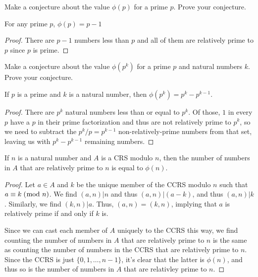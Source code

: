 \documentclass[../main.tex]{subfiles}
\begin{document}
\begin{ex} \label{6.18}
  Make a conjecture about the value $\phi(p)$ for a prime $p$. Prove your conjecture.
\end{ex}

\begin{PC} \label{PC 6.18}
  For any prime $p$, $\phi(p) = p-1$
\end{PC}

\begin{proof}
  There are $p-1$ numbers less than $p$ and all of them are relatively prime to $p$ since $p$ is prime.
\end{proof}



\begin{ex} \label{6.19}
  Make a conjecture about the value $\phi(p^k)$ for a prime $p$ and natural numbers $k$. Prove your conjecture.
\end{ex}

\begin{PC} \label{PC 6.19}
  If $p$ is a prime and $k$ is a natural number, then $\phi(p^k) = p^k - p^{k-1}$.
\end{PC}

\begin{proof}
  There are $p^k$ natural numbers less than or equal to $p^k$. Of those, $1$ in every $p$ have a $p$ in their prime factorization and thus are not relatively prime to $p^k$, so we need to subtract the $p^k / p = p^{k-1}$ non-relatively-prime numbers from that set, leaving us with $p^k - p^{k-1}$ remaining numbers.
\end{proof}



\begin{thm} \label{6.20}
  If $n$ is a natural number and $A$ is a CRS modulo $n$, then the number of numbers in $A$ that are relatively prime to $n$ is equal to $\phi(n)$.
\end{thm}

\begin{proof}
  Let $a \in A$ and $k$ be the unique member of the CCRS modulo $n$ such that $a \equiv k \; (\bmod \; n)$. We find $(a, n) | n$ and thus $(a, n) | (a - k)$, and thus $(a, n) | k$. Similarly, we find $(k, n) | a$. Thus, $(a, n) = (k, n)$, implying that $a$ is relatively prime if and only if $k$ is.

  Since we can cast each member of $A$ uniquely to the CCRS this way, we find counting the number of numbers in $A$ that are relatively prime to $n$ is the same as counting the number of numbers in the CCRS that are relatively prime to $n$. Since the CCRS is just $\{0, 1, \ldots, n-1\}$, it's clear that the latter is $\phi(n)$, and thus so is the number of numbers in $A$ that are relativley prime to $n$.
\end{proof}
\end{document}
